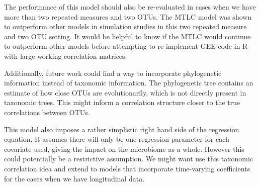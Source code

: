 \documentclass[12pt]{article}
\begin{document}
The performance of this model should also be re-evaluated in cases when we have more than two repeated measures and two OTUs. The MTLC model was shown to outperform other models in simulation studies in this two repeated measure and two OTU setting. It would be helpful to know if the MTLC would continue to outperform other models before attempting to re-implement GEE code in R with large working correlation matrices.

Additionally, future work could find a way to incorporate phylogenetic information instead of taxonomic information. The phylogenetic tree contains an estimate of how close OTUs are evolutionarily, which is not directly present in taxonomic trees. This might inform a correlation structure closer to the true correlations between OTUs.

This model also imposes a rather simplistic right hand side of the regression equation. It assumes there will only be one regression parameter for each covariate used, giving the impact on the microbiome as a whole. However this could potentially be a restrictive assumption. We might want use this taxonomic correlation idea and extend to models that incorporate time-varying coefficients for the cases when we have longitudinal data.










\begin{singlespace}
\printbibliography
\end{singlespace}
\end{document}
